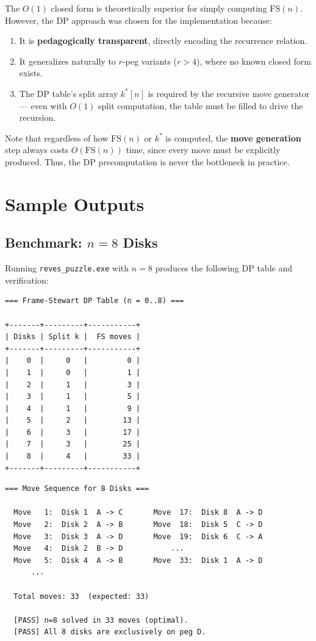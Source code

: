 \documentclass[12pt, a4paper]{article}
\begin{document}
The $O(1)$ closed form is theoretically superior for simply computing $\text{FS}(n)$.
However, the DP approach was chosen for the implementation because:
\begin{enumerate}[leftmargin=2em]
    \item It is \textbf{pedagogically transparent}, directly encoding the recurrence relation.
    \item It generalizes naturally to $r$-peg variants ($r > 4$), where no known closed form exists.
    \item The DP table's split array $k^*[n]$ is required by the recursive move generator — even with $O(1)$ split computation, the table must be filled to drive the recursion.
\end{enumerate}

Note that regardless of how $\text{FS}(n)$ or $k^*$ is computed, the \textbf{move generation} step always costs $O(\text{FS}(n))$ time, since every move must be explicitly produced. Thus, the DP precomputation is never the bottleneck in practice.


\section{Sample Outputs}
\label{sec:outputs}

\subsection{Benchmark: $n = 8$ Disks}

Running \texttt{reves\_puzzle.exe} with $n = 8$ produces the following DP table and verification:

\begin{lstlisting}[style=output, caption={DP table output for $n = 8$}]
=== Frame-Stewart DP Table (n = 0..8) ===

+-------+---------+-----------+
| Disks | Split k |  FS moves |
+-------+---------+-----------+
|    0  |     0   |         0 |
|    1  |     0   |         1 |
|    2  |     1   |         3 |
|    3  |     1   |         5 |
|    4  |     1   |         9 |
|    5  |     2   |        13 |
|    6  |     3   |        17 |
|    7  |     3   |        25 |
|    8  |     4   |        33 |
+-------+---------+-----------+
\end{lstlisting}

\begin{lstlisting}[style=output, caption={Selected moves and verification for $n = 8$}]
=== Move Sequence for 8 Disks ===

  Move   1:  Disk 1  A -> C       Move  17:  Disk 8  A -> D
  Move   2:  Disk 2  A -> B       Move  18:  Disk 5  C -> D
  Move   3:  Disk 3  A -> D       Move  19:  Disk 6  C -> A
  Move   4:  Disk 2  B -> D           ...
  Move   5:  Disk 4  A -> B       Move  33:  Disk 1  A -> D
      ...

  Total moves: 33  (expected: 33)

  [PASS] n=8 solved in 33 moves (optimal).
  [PASS] All 8 disks are exclusively on peg D.
\end{lstlisting}
\end{document}
